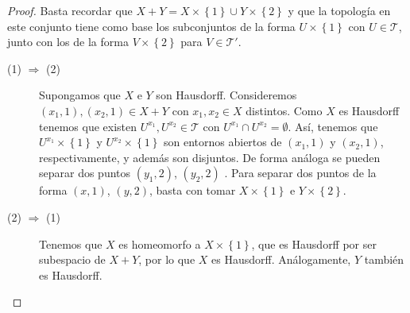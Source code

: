 \begin{proof}
	Basta recordar que $\displaystyle X + Y = X \times \left\{ 1\right\} \cup Y \times \left\{ 2\right\}  $ y que la topología en este conjunto tiene como base los subconjuntos de la forma $\displaystyle U \times \left\{ 1\right\}  $ con $\displaystyle U \in \mathcal{T} $, junto con los de la forma $\displaystyle V \times \left\{ 2\right\}  $ para $\displaystyle V \in \mathcal{T}' $. 
\begin{description}
	\item[(1) $\displaystyle \Rightarrow $ (2)] Supongamos que $\displaystyle X $ e $\displaystyle Y $ son Hausdorff. Consideremos $\displaystyle \left(x_{1}, 1\right), \left(x_{2}, 1\right)\in X + Y $ con $\displaystyle x_{1}, x_{2} \in X $ distintos. Como $\displaystyle X $ es Hausdorff tenemos que existen $\displaystyle U^{x_{1}}, U^{x_{2}} \in \mathcal{T}$ con $\displaystyle U^{x_{1}} \cap U^{x_{2}} = \emptyset $. Así, 
		tenemos que $\displaystyle U^{x_{1}} \times \left\{ 1\right\}  $ y $\displaystyle U^{x_{2}} \times \left\{ 1\right\}  $ son entornos abiertos de $\displaystyle \left(x_{1}, 1\right) $ y $\displaystyle \left(x_{2}, 1\right) $, respectivamente, y además son disjuntos. De forma análoga se pueden separar dos puntos $\displaystyle \left(y_{1}, 2\right) $, $\displaystyle  \left(y_{2}, 2\right) $ . Para separar dos puntos de la forma $\displaystyle \left(x,1\right) $, $\displaystyle \left(y, 2\right) $, basta con tomar $\displaystyle X \times \left\{ 1\right\}  $ e $\displaystyle Y \times \left\{ 2\right\}  $. 
	\item[(2) $\displaystyle \Rightarrow $ (1)] Tenemos que $\displaystyle X $ es homeomorfo a $\displaystyle X \times \left\{ 1\right\}  $, que es Hausdorff por ser subespacio de $\displaystyle X + Y $, por lo que $\displaystyle X $ es Hausdorff. Análogamente, $\displaystyle Y $ también es Hausdorff. 
\end{description}
\end{proof}
